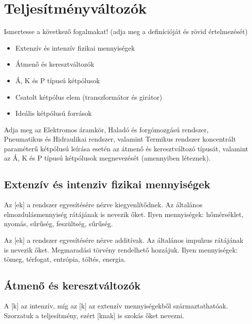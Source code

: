 \documentclass[../main.tex]{subfiles}
\begin{document}
\section{Teljesítményváltozók}

\begin{fulltheorem}
  Ismertesse a következő fogalmakat!
  (adja meg a definícióját és rövid értelmezését)
  \begin{itemize}
    \item Extenzív és intenzív fizikai mennyiségek
    \item Átmenő és keresztváltozók
    \item Á, K és P típusú kétpólusok
    \item Csatolt kétpólus elem (transzformátor és girátor)
    \item Ideális kétpólusú források
  \end{itemize}
  Adja meg az Elektromos áramkör, Haladó és forgómozgású rendszer, Pneumatikus
  és Hidraulikai rendszer, valamint Termikus rendszer koncentrált paraméterű
  kétpólusú leírása esetén az átmenő és keresztváltozó típusát, valamint az Á,
  K és P típusú kétpólusok megnevezését (amennyiben léteznek).
\end{fulltheorem}

\subsection{Extenzív és intenziv fizikai mennyiségek}

Az [ek] a rendszer egyesítésére nézve
kiegyenlítődnek. Az általános elmozdulásmennyiség rátájának is nevezik őket.
Ilyen mennyiségek: hőmérséklet, nyomás, sűrűség, feszültség, sűrűség.

Az [ek] a rendszer egyesítésére nézve
additívak. Az általános impulzus rátájának is nevezik őket.
Megmaradási törvény rendelhető hozzájuk.
Ilyen mennyiségek: tömeg, térfogat, entrópia, töltés, energia.

\subsection{Átmenő és keresztváltozók}

A [k] az intenzív, míg az [k]
az extenzív mennyiségekből származtathatóak. Szorzatuk a teljesítmény,
ezért [knak] is szokás őket nevezni.
\end{document}
